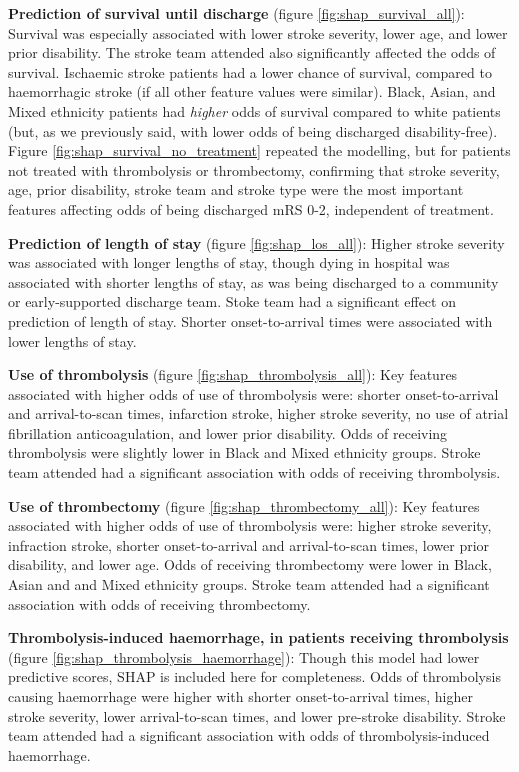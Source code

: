 \textbf{Prediction of survival until discharge} (figure \ref{fig:shap_survival_all}): Survival was especially associated with lower stroke severity, lower age, and lower prior disability. The stroke team attended also significantly affected the odds of survival. Ischaemic stroke patients had a lower chance of survival, compared to haemorrhagic stroke (if all other feature values were similar). Black, Asian, and Mixed ethnicity patients had \textit{higher} odds of survival compared to white patients (but, as we previously said, with lower odds of being discharged disability-free). Figure \ref{fig:shap_survival_no_treatment} repeated the modelling, but for patients not treated with thrombolysis or thrombectomy, confirming that stroke severity, age, prior disability, stroke team and stroke type were the most important features affecting odds of being discharged mRS 0-2, independent of treatment.

\textbf{Prediction of length of stay} (figure \ref{fig:shap_los_all}): Higher stroke severity was associated with longer lengths of stay, though dying in hospital was associated with shorter lengths of stay, as was being discharged to a community or early-supported discharge team. Stoke team had a significant effect on prediction of length of stay. Shorter onset-to-arrival times were associated with lower lengths of stay.

\textbf{Use of thrombolysis} (figure \ref{fig:shap_thrombolysis_all}): Key features associated with higher odds of use of thrombolysis were: shorter onset-to-arrival and arrival-to-scan times, infarction stroke, higher stroke severity, no use of atrial fibrillation anticoagulation, and lower prior disability. Odds of receiving thrombolysis were slightly lower in Black and Mixed ethnicity groups. Stroke team attended had a significant association with odds of receiving thrombolysis.

\textbf{Use of thrombectomy} (figure \ref{fig:shap_thrombectomy_all}): Key features associated with higher odds of use of thrombolysis were: higher stroke severity, infraction stroke, shorter onset-to-arrival and arrival-to-scan times, lower prior disability, and lower age. Odds of receiving thrombectomy were  lower in Black, Asian and and Mixed ethnicity groups. Stroke team attended had a significant association with odds of receiving thrombectomy.

\textbf{Thrombolysis-induced haemorrhage, in patients receiving thrombolysis} (figure \ref{fig:shap_thrombolysis_haemorrhage}): Though this model had lower predictive scores, SHAP is included here for completeness. Odds of thrombolysis causing haemorrhage were higher with shorter onset-to-arrival times, higher stroke severity, lower arrival-to-scan times, and lower pre-stroke disability. Stroke team attended had a significant association with odds of thrombolysis-induced haemorrhage.

